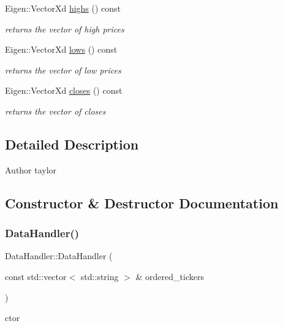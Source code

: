 \begin{DoxyCompactItemize}
Eigen\+::\+Vector\+Xd \hyperlink{classDataHandler_a94ccb9422f3f7d50ad07c3a0553baab9}{highs} () const
\begin{DoxyCompactList}\small\item\em returns the vector of high prices \end{DoxyCompactList}\item 
Eigen\+::\+Vector\+Xd \hyperlink{classDataHandler_ad0b44f8a121372a519922feea6dd02e4}{lows} () const
\begin{DoxyCompactList}\small\item\em returns the vector of low prices \end{DoxyCompactList}\item 
Eigen\+::\+Vector\+Xd \hyperlink{classDataHandler_a18f429318b33936acaff563835729e1c}{closes} () const
\begin{DoxyCompactList}\small\item\em returns the vector of closes \end{DoxyCompactList}\end{DoxyCompactItemize}


\subsection{Detailed Description}
\begin{DoxyAuthor}{Author}
taylor 
\end{DoxyAuthor}


\subsection{Constructor \& Destructor Documentation}
\mbox{\label{classDataHandler_a754e8043d3c0249833f9bf47dcfff4cd}} 
\subsubsection{\texorpdfstring{Data\+Handler()}{DataHandler()}}
{\footnotesize\ttfamily Data\+Handler\+::\+Data\+Handler (\begin{DoxyParamCaption}\item[{const std\+::vector$<$ std\+::string $>$ \&}]{ordered\+\_\+tickers }\end{DoxyParamCaption})}



ctor 



